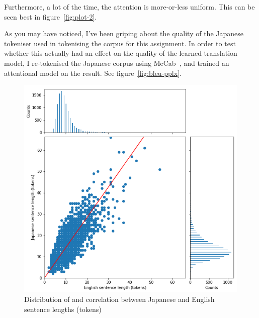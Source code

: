 \documentclass[answers]{exam}
\begin{document}
\begin{CJK}{UTF8}{min}
\begin{questions}
\begin{framed}
  Furthermore, a lot of the time, the attention is more-or-less uniform. This
  can be seen best in figure~\ref{fig:plot-2}.
\end{framed}

\clearpage

\begin{framed}
  As you may have noticed, I've been griping about the quality of the Japanese
  tokeniser used in tokenising the corpus for this assignment.
  In order to test whether this actually had an effect on the quality of the
  learned translation model, I re-tokenised the Japanese corpus using
  MeCab~\citep{Kudo-2005}, and trained an attentional model on the result. See
  figure~\ref{fig:bleu-pplx}.
\end{framed}

\end{questions}




\begin{figure}
  \centering
  \includegraphics[width=\linewidth]{fig-corr-toks}
  \caption[Sentence lenths (tokens)]%
  {Distribution of and correlation between Japanese and English sentence lengths (tokens)}
  \label{fig:corr-toks}
\end{figure}


\end{CJK}
\end{document}
